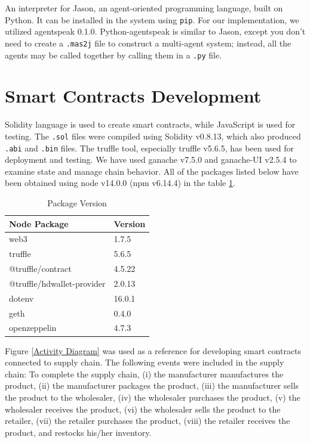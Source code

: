 An interpreter for Jason, an agent-oriented programming language, built on Python. It can be installed in the system using \texttt{\ac{pip}}. For our implementation, we utilized agentspeak 0.1.0. Python-agentspeak is similar to Jason, except you don't need to create a \texttt{.mas2j} file to construct a multi-agent system; instead, all the agents may be called together by calling them in a \texttt{.py} file.

\section{Smart Contracts Development}

Solidity language is used to create smart contracts, while JavaScript is used for testing. The \texttt{.sol} files were compiled using Solidity v0.8.13, which also produced \texttt{.abi} and \texttt{.bin} files. The truffle tool, especially truffle v5.6.5, has been used for deployment and testing. We have used ganache v7.5.0 and ganache-UI v2.5.4 to examine state and manage chain behavior. All of the packages listed below have been obtained using node v14.0.0 (npm v6.14.4) in the table \ref{Package Version}.
    
\vspace{.5cm}

\begin{table}[h]
\small
\centering
\caption{Package Version}
\label{Package Version}
\begin{tabular}{|l| l|}
\hline
\textbf{Node Package} & \textbf{Version} \\ 
\hline\hline
web3 & 1.7.5\\ \hline
truffle & 5.6.5\\ \hline 
@truffle/contract & 4.5.22\\ \hline 
@truffle/hdwallet-provider & 2.0.13\\ \hline
dotenv & 16.0.1\\ \hline
geth & 0.4.0\\ \hline
openzeppelin & 4.7.3\\ \hline
\hline 
\end{tabular}
\end{table}

\vspace{.5cm}

Figure \ref{Activity Diagram} was used as a reference for developing smart contracts connected to supply chain. The following events were included in the supply chain: To complete the supply chain, (i) the manufacturer manufactures the product, (ii) the manufacturer packages the product, (iii) the manufacturer sells the product to the wholesaler, (iv) the wholesaler purchases the product, (v) the wholesaler receives the product, (vi) the wholesaler sells the product to the retailer, (vii) the retailer purchases the product, (viii) the retailer receives the product, and restocks his/her inventory.

